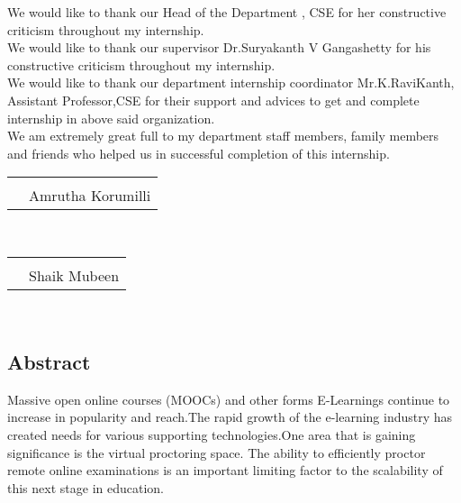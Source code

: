 \documentclass[12pt]{report}
\begin{document}
We would like to thank our Head of the Department , CSE for her constructive criticism throughout my internship.\\

We would like to thank our supervisor Dr.Suryakanth V Gangashetty for his constructive criticism throughout my internship.\\

We would like to thank our department internship coordinator Mr.K.RaviKanth, Assistant Professor,CSE for their support and advices to get and
complete internship in above said organization.\\

We am extremely great full to my department staff members, family members and friends who helped us in successful completion of this internship.

\vspace{0.8in}
\begin{center}
\begin{tabular}{c c}
\textbf {} & \hspace{10.7cm}   \textbf{}\\
  & \hspace{10.7cm} Amrutha Korumilli\\
\end{tabular}\\
\begin{tabular}{c c}
\textbf {} & \hspace{11.5cm}   \textbf{}\\
  & \hspace{11.5cm} Shaik Mubeen\\
\end{tabular}\\
\end{center}



\pagebreak



\begin{center}
\section*{Abstract}
\end{center}

Massive open online courses (MOOCs) and other forms E-Learnings continue to increase in popularity and reach.The rapid growth of the e-learning industry has created needs for various supporting technologies.One area that is gaining significance is the virtual proctoring space.
The ability to efficiently proctor remote online examinations is an important limiting factor to the scalability of this next stage in education. \\
\end{document}
